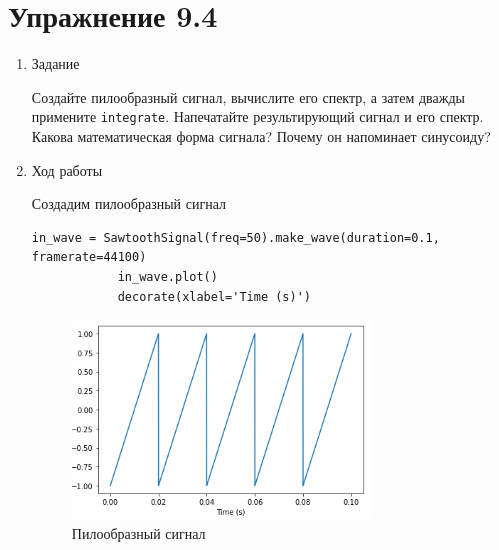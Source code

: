 \documentclass[a4paper,12pt]{article}
\begin{document}
	\section{Упражнение 9.4}
	
	\begin{enumerate}
		
		\item{Задание}
		
		Создайте пилообразный сигнал, вычислите его спектр, а затем дважды примените \texttt{integrate}. Напечатайте результирующий сигнал и его спектр. Какова математическая форма сигнала? Почему он напоминает синусоиду?
		
		\item{Ход работы}
		
		Создадим пилообразный сигнал
		\begin{lstlisting}[caption=Создаем пилообразный сигнал]
			in_wave = SawtoothSignal(freq=50).make_wave(duration=0.1, framerate=44100)
			in_wave.plot()
			decorate(xlabel='Time (s)')
		\end{lstlisting}
		\begin{figure}[H]
			\centering
			\includegraphics[width=0.75\textwidth]{4_1.png}
			\caption{Пилообразный сигнал}
			\label{fig:4.1}
		\end{figure}
		

\end{enumerate}
\end{document}
